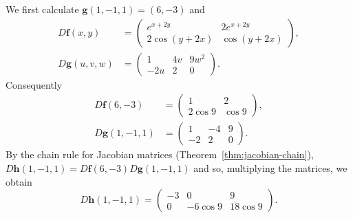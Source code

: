 \solution
We first calculate \(\mathbf{g}(1,-1,1) = (6,-3)\) and 
\[
    \begin{aligned}
        D\mathbf{f}(x,y) &= 
        \begin{pmatrix}
           e^{x+2y} & 2 e^{x+2y}\\
           2 \cos(y+2x) & \cos(y+2x)
        \end{pmatrix},\\
        D\mathbf{g}(u,v,w) &= 
        \begin{pmatrix}
            1 & 4v & 9w^2 \\
            -2u & 2 & 0
        \end{pmatrix}.   
    \end{aligned}
\]
Consequently
\[
    \begin{aligned}
        D\mathbf{f}(6,-3) &= 
        \begin{pmatrix}
           1 & 2 \\
           2 \cos 9 & \cos 9
        \end{pmatrix},\\
        D\mathbf{g}(1,-1,1) &= 
        \begin{pmatrix}
            1 & -4 & 9 \\
            -2 & 2 & 0
        \end{pmatrix}.   
    \end{aligned}
\]
By the chain rule for Jacobian matrices (Theorem~\ref{thm:jacobian-chain}),
\( D\mathbf{h}(1,-1,1) = D\mathbf{f}(6,-3)  D\mathbf{g}(1,-1,1) \)
and so, multiplying the matrices, we obtain 
$$D\mathbf{h}(1,-1,1) =
    \begin{pmatrix}
        -3 & 0 & 9 \\
        0        & -6\cos 9 & 18\cos 9
    \end{pmatrix}.
$$





